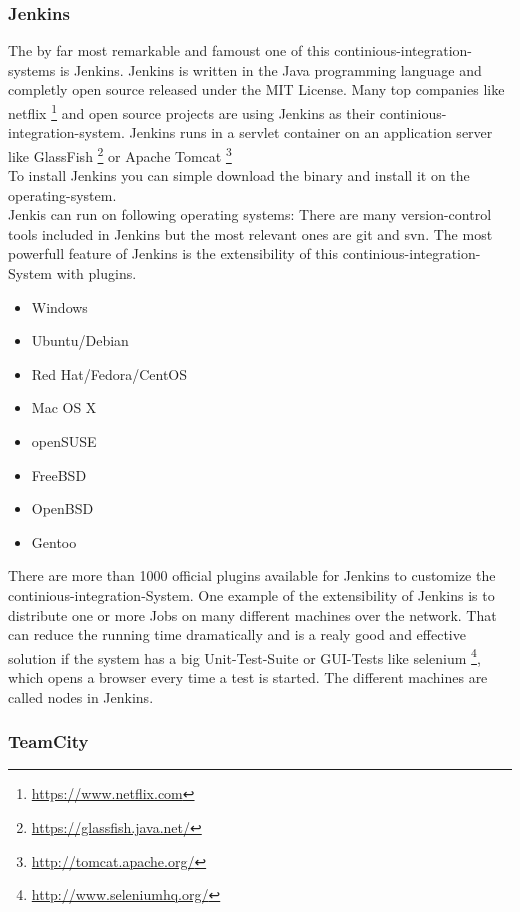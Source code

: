 \subsubsection{Jenkins}
The by far most remarkable and famoust one of this continious-integration-systems is Jenkins. 
Jenkins is written in the Java programming language and completly open source released under the MIT License.
Many top companies like netflix \footnote{\url{https://www.netflix.com}} and open source projects
are using Jenkins as their continious-integration-system.
Jenkins runs in a servlet container on an application server like GlassFish \footnote{\url{https://glassfish.java.net/}}
or Apache Tomcat \footnote{\url{http://tomcat.apache.org/}} \\
To install Jenkins you can simple download the binary and install it on the operating-system.\\
Jenkis can run on following operating systems: 
There are many version-control tools included in Jenkins but the most relevant ones are git and svn.
The most powerfull feature of Jenkins is the extensibility of this continious-integration-System 
with plugins.\\

\begin{itemize} 
        \item Windows
        \item Ubuntu/Debian
        \item Red Hat/Fedora/CentOS
        \item Mac OS X
        \item openSUSE
        \item FreeBSD
        \item OpenBSD
        \item Gentoo
\end{itemize}

There are more than 1000 official plugins available for Jenkins to customize the continious-integration-System.  
One example of the extensibility of Jenkins is to distribute one or more  Jobs on many 
different machines over the network. That can reduce the running time dramatically and 
is a realy good and effective solution if the system has a big Unit-Test-Suite or GUI-Tests 
like selenium \footnote{\url{http://www.seleniumhq.org/}}, which opens a browser every time 
a test is started. The different machines are called nodes in Jenkins.

\subsubsection{TeamCity}

